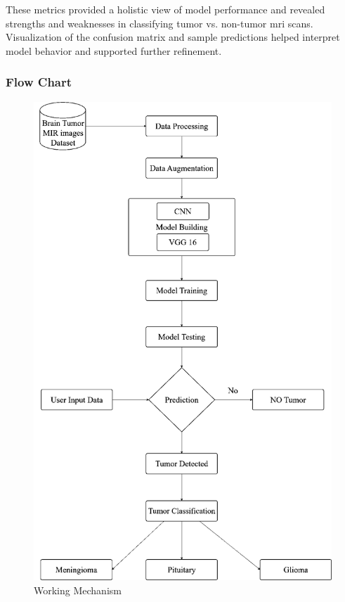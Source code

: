 These metrics provided a holistic view of model performance and revealed strengths and weaknesses in classifying tumor vs. non-tumor \gls{mri} scans. Visualization of the confusion matrix and sample predictions helped interpret model behavior and supported further refinement.

\subsubsection{Flow Chart}
\begin{figure}[H]
    \centering
    \includegraphics[width=0.85\linewidth]{Images/flow.png}
    \caption{Working Mechanism}
    \label{fig:Working Mechanism}
\end{figure}
